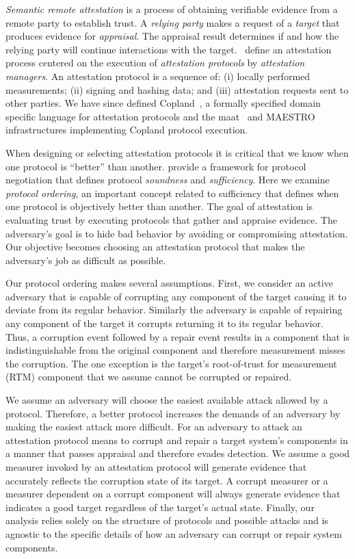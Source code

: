 \documentclass[runningheads]{llncs}
\theoremstyle{definition}
\begin{document}
\emph{Semantic remote
  attestation}\citep{Haldar:04:Semantic-Remote,coker2011principles} is
a process of obtaining verifiable evidence from a remote party to
establish trust.  A \emph{relying party} makes a request of a
\emph{target} that produces evidence for \emph{appraisal}. The
appraisal result determines if and how the relying party will continue
interactions with the target.  \citet{Coker::Principles-of-R}~define
an attestation process centered on the execution of \emph{attestation
  protocols} by \emph{attestation managers}.  An attestation protocol
is a sequence of: (i) locally performed measurements; (ii) signing and
hashing data; and (iii) attestation requests sent to other parties.
We have since defined Copland~\citep{Rowe:2019:Orchestrating}, a
formally specified domain specific language for attestation protocols
and the maat~\citep{Pendergrass:2018:Maat} and
MAESTRO~\citep{Petz:2021:faithful} infrastructures implementing
Copland protocol execution.

When designing or selecting attestation protocols it is critical that
we know when one protocol is ``better'' than another.
\citet{Fritz:2023:framework} provide a framework for protocol
negotiation that defines protocol \emph{soundness} and
\emph{sufficiency}.  Here we examine \emph{protocol ordering}, an
important concept related to sufficiency that defines when one
protocol is objectively better than another.  The goal of attestation
is evaluating trust by executing protocols that gather and appraise
evidence.  The adversary's goal is to hide bad behavior by avoiding or
compromising attestation.  Our objective becomes choosing an
attestation protocol that makes the adversary's job as difficult as
possible.

Our protocol ordering makes several assumptions. First, we consider an
active adversary that is capable of corrupting any component of the
target causing it to deviate from its regular behavior.  Similarly the
adversary is capable of repairing any component of the target it
corrupts returning it to its regular behavior. Thus, a corruption
event followed by a repair event results in a component that is
indistinguishable from the original component and therefore
measurement misses the corruption. The one exception is the target's
root-of-trust for measurement (RTM) component that we assume cannot be
corrupted or repaired.

We assume an adversary will choose the easiest available attack
allowed by a protocol. Therefore, a better protocol increases the
demands of an adversary by making the easiest attack more
difficult. For an adversary to attack an attestation protocol means to
corrupt and repair a target system's components in a manner that
passes appraisal and therefore evades detection.  We assume a good
measurer invoked by an attestation protocol will generate evidence
that accurately reflects the corruption state of its target.  A
corrupt measurer or a measurer dependent on a corrupt component will
always generate evidence that indicates a good target regardless of
the target's actual state.  Finally, our analysis relies solely on the
structure of protocols and possible attacks and is agnostic to the
specific details of how an adversary can corrupt or repair system
components.
\end{document}
